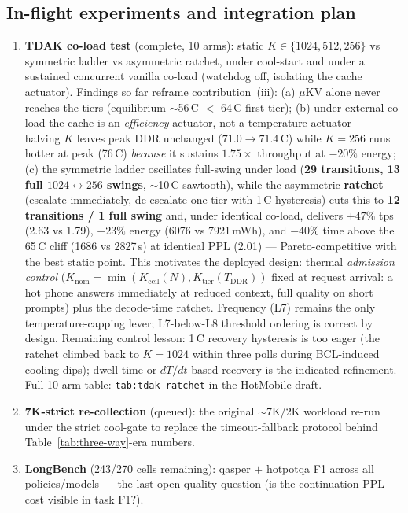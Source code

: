 \documentclass[sigconf, anonymous=false, screen=true]{acmart}
\begin{document}
\subsection{In-flight experiments and integration plan}
\begin{enumerate}[leftmargin=*, itemsep=1pt]
\item \textbf{TDAK co-load test} (complete, 10 arms): static $K\in\{1024,512,256\}$ vs symmetric ladder vs asymmetric ratchet, under cool-start and under a sustained concurrent vanilla co-load (watchdog off, isolating the cache actuator). Findings so far reframe contribution~(iii): (a) $\mu$KV alone never reaches the tiers (equilibrium $\sim$56\,\textdegree C $<$ 64\,\textdegree C first tier); (b) under external co-load the cache is an \emph{efficiency} actuator, not a temperature actuator --- halving $K$ leaves peak DDR unchanged ($71.0 \to 71.4$\,\textdegree C) while $K{=}256$ runs hotter at peak (76\,\textdegree C) \emph{because} it sustains $1.75\times$ throughput at $-20\%$ energy; (c) the symmetric ladder oscillates full-swing under load (\textbf{29 transitions, 13 full $1024{\leftrightarrow}256$ swings}, $\sim$10\,\textdegree C sawtooth), while the asymmetric \textbf{ratchet} (escalate immediately, de-escalate one tier with 1\,\textdegree C hysteresis) cuts this to \textbf{12 transitions / 1 full swing} and, under identical co-load, delivers $+47\%$ tps (2.63 vs 1.79), $-23\%$ energy (6076 vs 7921\,mWh), and $-40\%$ time above the 65\,\textdegree C cliff (1686 vs 2827\,s) at identical PPL (2.01) --- Pareto-competitive with the best static point. This motivates the deployed design: thermal \emph{admission control} ($K_\mathrm{nom} = \min(K_\mathrm{ceil}(N), K_\mathrm{tier}(T_\mathrm{DDR}))$ fixed at request arrival: a hot phone answers immediately at reduced context, full quality on short prompts) plus the decode-time ratchet. Frequency (L7) remains the only temperature-capping lever; L7-below-L8 threshold ordering is correct by design. Remaining control lesson: 1\,\textdegree C recovery hysteresis is too eager (the ratchet climbed back to $K{=}1024$ within three polls during BCL-induced cooling dips); dwell-time or $dT/dt$-based recovery is the indicated refinement. Full 10-arm table: \texttt{tab:tdak-ratchet} in the HotMobile draft.
\item \textbf{7K-strict re-collection} (queued): the original $\sim$7K/2K workload re-run under the strict cool-gate to replace the timeout-fallback protocol behind Table~\ref{tab:three-way}-era numbers.
\item \textbf{LongBench} (243/270 cells remaining): qasper $+$ hotpotqa F1 across all policies/models --- the last open quality question (is the continuation PPL cost visible in task F1?).

\end{enumerate}
\end{document}
